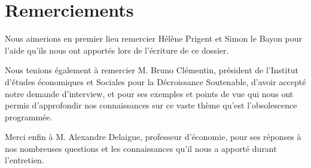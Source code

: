 \chapter*{Remerciements}


Nous aimerions en premier lieu remercier Hélène Prigent et Simon le Bayon pour l'aide qu'ils nous ont apportés lors de l'écriture de ce dossier.

\bigbreak Nous tenions également à remercier M. Bruno Clémentin, président de l'Institut d'études économiques et Sociales pour la Décroissance Soutenable, d'avoir accepté notre demande d'interview, et pour ses exemples et points de vue qui nous ont permis d'approfondir nos connaissances sur ce vaste thème qu'est l'obsolescence programmée.

\bigbreak
Merci enfin à M. Alexandre Delaigue, professeur d'économie, pour ses réponses à nos nombreuses questions et les connaissances qu'il nous a apporté durant l'entretien.

